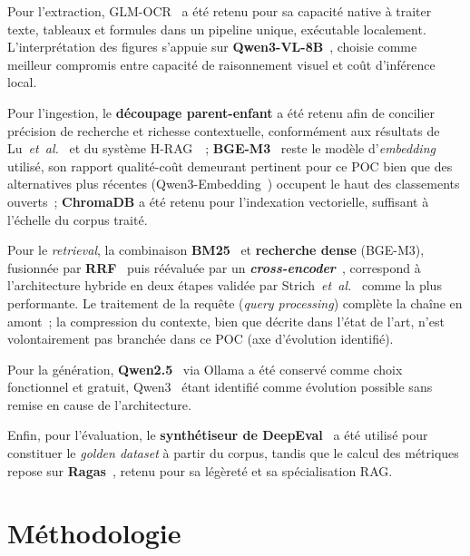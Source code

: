 \documentclass[11pt,a4paper]{article}
\begin{document}
Pour l'extraction, \textsc{GLM-OCR}~\cite{glmocr2026} a été retenu pour sa capacité native à traiter texte, tableaux et formules dans un pipeline unique, exécutable localement. L'interprétation des figures s'appuie sur \textbf{Qwen3-VL-8B}~\cite{qwen2025qwen3vl}, choisie comme meilleur compromis entre capacité de raisonnement visuel et coût d'inférence local.

Pour l'ingestion, le \textbf{découpage parent-enfant} a été retenu afin de concilier précision de recherche et richesse contextuelle, conformément aux résultats de Lu~\textit{et~al.}~\cite{lu2025hichunk} et du système H-RAG~\cite{hrag2026semeval}~; \textbf{BGE-M3}~\cite{chen2024bgem3} reste le modèle d'\textit{embedding} utilisé, son rapport qualité-coût demeurant pertinent pour ce POC bien que des alternatives plus récentes (Qwen3-Embedding~\cite{zhang2025qwen3embedding}) occupent le haut des classements ouverts~; \textbf{ChromaDB} a été retenu pour l'indexation vectorielle, suffisant à l'échelle du corpus traité.

Pour le \textit{retrieval}, la combinaison \textbf{BM25}~\cite{robertson2009bm25} et \textbf{recherche dense} (BGE-M3), fusionnée par \textbf{RRF}~\cite{cormack2009rrf} puis réévaluée par un \textbf{\textit{cross-encoder}}~\cite{nogueira2019bert,xiao2024bge}, correspond à l'architecture hybride en deux étapes validée par Strich~\textit{et~al.}~\cite{strich2026bm25} comme la plus performante. Le traitement de la requête (\textit{query processing}) complète la chaîne en amont~; la compression du contexte, bien que décrite dans l'état de l'art, n'est volontairement pas branchée dans ce POC (axe d'évolution identifié).

Pour la génération, \textbf{Qwen2.5}~\cite{qwen2024qwen25} via Ollama a été conservé comme choix fonctionnel et gratuit, Qwen3~\cite{qwen2025qwen3} étant identifié comme évolution possible sans remise en cause de l'architecture.

Enfin, pour l'évaluation, le \textbf{synthétiseur de DeepEval}~\cite{deepeval2024} a été utilisé pour constituer le \textit{golden dataset} à partir du corpus, tandis que le calcul des métriques repose sur \textbf{Ragas}~\cite{es2024ragas}, retenu pour sa légèreté et sa spécialisation RAG.

\section{Méthodologie}
\label{sec:methodologie}
\end{document}
